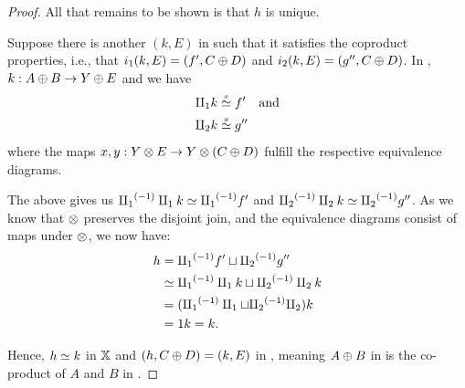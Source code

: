 \begin{proof}
  All that remains to be shown is that $h$ is unique.

  Suppose there is another $(k,E)$ in \Xt such that it satisfies the coproduct properties, i.e.,
  that $i_1 (k,E) = (f',C\oplus D)$ and $i_2 (k,E) = (g'',C\oplus D)$. In \X, $k:A\oplus B \to Y \oplus E$ and we have
  \begin{align*}
    \amalg_{1} k &\overset{\scriptscriptstyle x}{\simeq} f'\quad\text{and}\\
    \amalg_{2} k &\overset{\scriptscriptstyle y}{\simeq} g''
  \end{align*}
  where the maps $x, y: Y\otimes E \to Y\otimes(C\oplus D)$ fulfill the respective equivalence diagrams.

  The above gives us ${\amalg_{1}}^{(-1)}\amalg_{1} k \overset{\scriptscriptstyle }{\simeq} {\amalg_{1}}^{(-1)} f'$ and ${\amalg_{2}}^{(-1)}\amalg_{2} k \overset{\scriptscriptstyle }{\simeq} {\amalg_{2}}^{(-1)} g''$.
  As we know that $\otimes$ preserves the disjoint join, and the equivalence diagrams consist of maps
  under $\otimes$, we now have:
  \begin{align*}
    h&={\amalg_{1}}^{(-1)} f' \sqcup {\amalg_{2}}^{(-1)} g''\\
    &\overset{\scriptscriptstyle }{\simeq} {\amalg_{1}}^{(-1)}\amalg_{1} k \sqcup {\amalg_{2}}^{(-1)}\amalg_{2} k\\
    &= ({\amalg_{1}}^{(-1)}\amalg_{1}  \sqcup {\amalg_{2}}^{(-1)}\amalg_{2}) k\\
    &= 1 k = k.
  \end{align*}

  Hence, $h \overset{\scriptscriptstyle }{\simeq} k$ in $\mathbb{X}$ and $(h, C\oplus D) = (k,E)$ in \Xt, meaning
 $A\oplus B$ in \X is the co-product of $A$ and $B$ in \Xt.
\end{proof}




